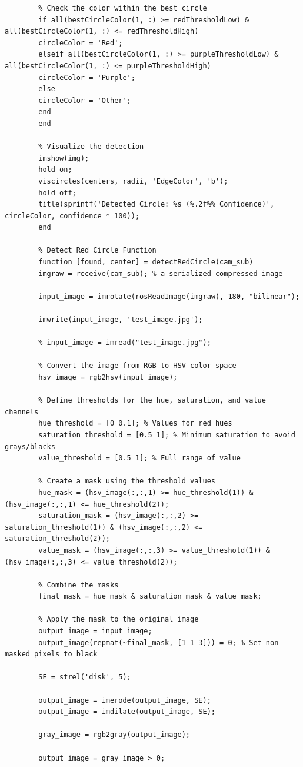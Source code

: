 \documentclass{article}
\begin{document}
\begin{verbatim}
		% Check the color within the best circle
		if all(bestCircleColor(1, :) >= redThresholdLow) & all(bestCircleColor(1, :) <= redThresholdHigh)
		circleColor = 'Red';
		elseif all(bestCircleColor(1, :) >= purpleThresholdLow) & all(bestCircleColor(1, :) <= purpleThresholdHigh)
		circleColor = 'Purple';
		else
		circleColor = 'Other';
		end
		end
		
		% Visualize the detection
		imshow(img);
		hold on;
		viscircles(centers, radii, 'EdgeColor', 'b');
		hold off;
		title(sprintf('Detected Circle: %s (%.2f%% Confidence)', circleColor, confidence * 100));
		end
		
		% Detect Red Circle Function
		function [found, center] = detectRedCircle(cam_sub)
		imgraw = receive(cam_sub); % a serialized compressed image
		
		input_image = imrotate(rosReadImage(imgraw), 180, "bilinear");
		
		imwrite(input_image, 'test_image.jpg');
		
		% input_image = imread("test_image.jpg");
		
		% Convert the image from RGB to HSV color space
		hsv_image = rgb2hsv(input_image);
		
		% Define thresholds for the hue, saturation, and value channels
		hue_threshold = [0 0.1]; % Values for red hues
		saturation_threshold = [0.5 1]; % Minimum saturation to avoid grays/blacks
		value_threshold = [0.5 1]; % Full range of value
		
		% Create a mask using the threshold values
		hue_mask = (hsv_image(:,:,1) >= hue_threshold(1)) & (hsv_image(:,:,1) <= hue_threshold(2));
		saturation_mask = (hsv_image(:,:,2) >= saturation_threshold(1)) & (hsv_image(:,:,2) <= saturation_threshold(2));
		value_mask = (hsv_image(:,:,3) >= value_threshold(1)) & (hsv_image(:,:,3) <= value_threshold(2));
		
		% Combine the masks
		final_mask = hue_mask & saturation_mask & value_mask;
		
		% Apply the mask to the original image
		output_image = input_image;
		output_image(repmat(~final_mask, [1 1 3])) = 0; % Set non-masked pixels to black
		
		SE = strel('disk', 5);
		
		output_image = imerode(output_image, SE);
		output_image = imdilate(output_image, SE);
		
		gray_image = rgb2gray(output_image);
		
		output_image = gray_image > 0;
		

\end{verbatim}
\end{document}
